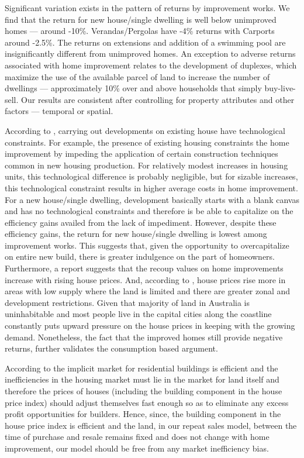 \documentclass[AEJ,reqno, draftmode]{AEA} %
\begin{document}
Significant variation exists in the pattern of returns by improvement works. We find that the return for new house/single dwelling is well below unimproved homes --- around -10\%. Verandas/Pergolas have -4\% returns with Carports around -2.5\%. The returns on extensions and addition of a swimming pool are insignificantly different from unimproved homes. An exception to adverse returns associated with home improvement relates to the development of duplexes, which maximize the use of the available parcel of land to increase the number of dwellings --- approximately 10\% over and above households that simply buy-live-sell. Our results are consistent after controlling for property attributes and other factors --- temporal or spatial.

According to \citet{potepan1989interest}, carrying out developments on existing house have technological constraints. For example, the presence of existing housing constraints the home improvement by impeding the application of certain construction techniques common in new housing production. For relatively modest increases in housing units, this technological difference is probably negligible, but for sizable increases, this technological constraint results in higher average costs in home improvement. For a new house/single dwelling, development basically starts with a blank canvas and has no technological constraints and therefore is be able to capitalize on the efficiency gains availed from the lack of impediment. However, despite these efficiency gains, the return for new house/single dwelling is lowest among improvement works. This suggests that, given the opportunity to overcapitalize on entire new build, there is greater indulgence on the part of homeowners. Furthermore, a \citet{jointcentreharvard} report suggests that the recoup values on home improvements increase with rising house prices. And, according to \citep{glaeser2008housing}, house prices rise more in areas with low supply where the land is limited and there are greater zonal and development restrictions. Given that majority of land in Australia is uninhabitable and most people live in the capital cities along the coastline constantly puts upward pressure on the house prices in keeping with the growing demand. Nonetheless, the fact that the improved homes still provide negative returns, further validates the consumption based argument.

According to \citet{rosenthal1999residential} the implicit market for residential buildings is efficient and the inefficiencies in the housing market must lie in the market for land itself and therefore the prices of houses (including the building component in the house price index) should adjust themselves fast enough so as to eliminate any excess profit opportunities for builders. Hence, since, the building component in the house price index is efficient and the land, in our repeat sales model, between the time of purchase and resale remains fixed and does not change with home improvement, our model should be free from any market inefficiency bias.
\end{document}

